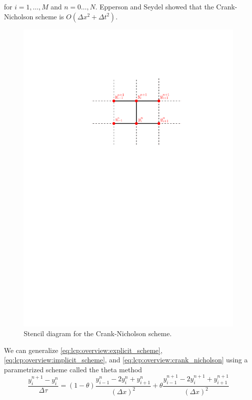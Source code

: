 for $i=1,\dots,M$ and $n=0\dots,N$. Epperson\cite{epperson_2013} and Seydel\cite{seydel_2009} showed that the Crank-Nicholson scheme is $O(\Delta{x}^2 + \Delta{t}^2)$.
\begin{figure}[H]
  \label{fig:lcp:thetamethod:stencil}
  \centering
  \includegraphics[scale=0.75]{chapters/chapter5/CrankNicholsonStencil.pdf}
  \caption{Stencil diagram for the Crank-Nicholson scheme.}
\end{figure} 
We can generalize \eqref{eq:lcp:overview:explicit_scheme}, \eqref{eq:lcp:overview:implicit_scheme}, and \eqref{eq:lcp:overview:crank_nicholson} using a parametrized scheme called the theta method 
\begin{equation}
  \label{eq:lcp:overview:theta_method}
  \dfrac{y^{n+1}_{i} - y^{n}_{i}}{\Delta \tau} = (1-\theta)\dfrac{y^{n}_{i-1} - 2y^{n}_{i} + y^{n}_{i+1}}{(\Delta x)^2} + \theta\dfrac{y^{n+1}_{i-1} - 2y^{n+1}_{i} + y^{n+1}_{i+1}}{(\Delta x)^2}
\end{equation}
